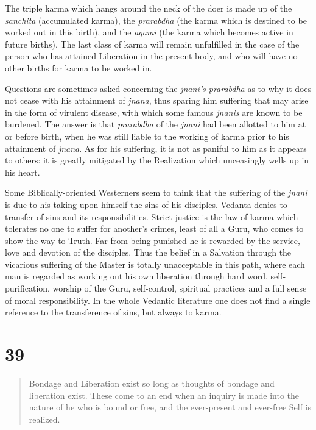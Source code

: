 \documentclass[12pt]{report}
\begin{document}
The triple karma which hangs around the neck of the doer is made up of
the \emph{sanchita} (accumulated karma), the \emph{prarabdha} (the
karma which is destined to be worked out in this birth), and the
\emph{agami} (the karma which becomes active in future births). The
last class of karma will remain unfulfilled in the case of the person
who has attained Liberation in the present body, and who will have no
other births for karma to be worked in.

Questions are sometimes asked concerning the \emph{jnani's prarabdha}
as to why it does not cease with his attainment of \emph{jnana}, thus
sparing him suffering that may arise in the form of virulent disease,
with which some famous \emph{jnanis} are known to be burdened. The
answer is that \emph{prarabdha} of the \emph{jnani} had been allotted
to him at or before birth, when he was still liable to the working of
karma prior to his attainment of \emph{jnana}. As for his suffering,
it is not as paniful to him as it appears to others: it is greatly
mitigated by the Realization which unceasingly wells up in his heart.

Some Biblically-oriented Westerners seem to think that the suffering
of the \emph{jnani} is due to his taking upon himself the sins of his
disciples. Vedanta denies to transfer of sins and its
responsibilities. Strict justice is the law of karma which tolerates
no one to suffer for another's crimes, least of all a Guru, who comes
to show the way to Truth. Far from being punished he is rewarded by
the service, love and devotion of the disciples. Thus the belief in a
Salvation through the vicarious suffering of the Master is totally
unacceptable in this path, where each man is regarded as working out
his own liberation through hard word, self-purification, worship of
the Guru, self-control, spiritual practices and a full sense of moral
responsibility. In the whole Vedantic literature one does not find a
single reference to the transference of sins, but always to karma.


\section{39}

\begin{quote}
  Bondage and Liberation exist so long as thoughts of bondage and
  liberation exist. These come to an end when an inquiry is made into
  the nature of he who is bound or free, and the ever-present and
  ever-free Self is realized.
\end{quote}
\end{document}
